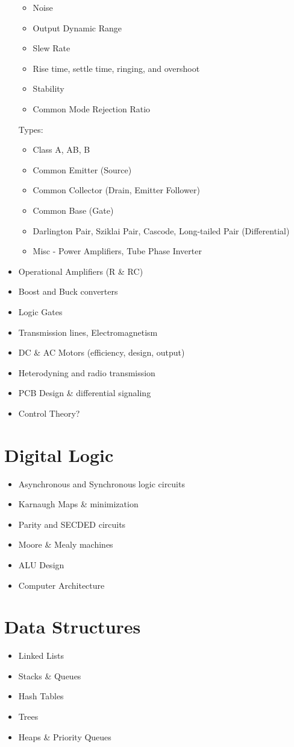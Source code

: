 \documentclass[a4paper]{article}
\begin{document}
\begin{itemize}
\begin{itemize}
  \item Noise
  \item Output Dynamic Range
  \item Slew Rate
  \item Rise time, settle time, ringing, and overshoot
  \item Stability
  \item Common Mode Rejection Ratio
  \end{itemize}
  Types:
  \begin{itemize}
  \item Class A, AB, B
  \item Common Emitter (Source)
  \item Common Collector (Drain, Emitter Follower)
  \item Common Base (Gate)
  \item Darlington Pair, Sziklai Pair, Cascode, Long-tailed Pair (Differential)
  \item Misc - Power Amplifiers, Tube Phase Inverter
  \end{itemize}
\item Operational Amplifiers (R \& RC)
\item Boost and Buck converters
\item Logic Gates
\item Transmission lines, Electromagnetism
\item DC \& AC Motors (efficiency, design, output)
\item Heterodyning and radio transmission
\item PCB Design \& differential signaling
\item Control Theory?
\end{itemize}

\section{Digital Logic}
\begin{itemize}
\item Asynchronous and Synchronous logic circuits
\item Karnaugh Maps \& minimization
\item Parity and SECDED circuits
\item Moore \& Mealy machines
\item ALU Design
\item Computer Architecture
\end{itemize}

\section{Data Structures}
\begin{itemize}
\item Linked Lists
\item Stacks \& Queues
\item Hash Tables
\item Trees
\item Heaps \& Priority Queues
\end{itemize}
\end{document}

